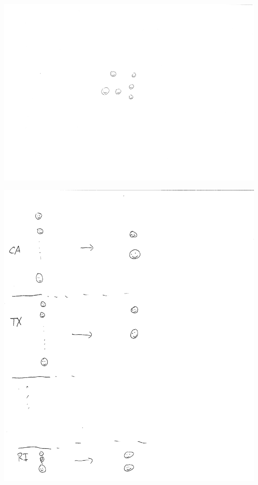 \documentclass[aspectratio=169]{beamer}
\begin{document}
\begin{frame}

\begin{center}
\includegraphics[height=\textheight]{figures/sample}
\end{center}

\end{frame}
\begin{frame}

\begin{center}
\includegraphics[height=\textheight]{figures/stratified_sampling_cps_sample_pop}
\end{center}

\end{frame}
\end{document}
